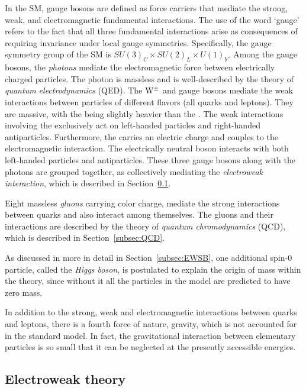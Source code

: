 In the SM, gauge bosons are defined as force carriers that mediate the strong, weak, and electromagnetic fundamental interactions.
The use of the word `gauge' refers to the fact that all three fundamental interactions arise as consequences of requiring invariance under local gauge symmetries. 
Specifically, the gauge symmetry group of the SM is $SU(3)_C \times SU(2)_L \times U(1)_Y$.
Among the gauge bosons, the \textit{photons} mediate the electromagnetic force between electrically charged particles.
The photon is massless and is well-described by the theory of \textit{quantum electrodynamics} (QED).
The $\mathrm{W}^{\pm}$ and \PZ gauge bosons mediate the weak interactions between particles of different flavors (all quarks and leptons).
They are massive, with the \PZ being slightly heavier than the \PW.
The weak interactions involving the \PW exclusively act on left-handed particles and right-handed antiparticles.
Furthermore, the \PW carries an electric charge and couples to the electromagnetic interaction.
The electrically neutral \PZ boson interacts with both left-handed particles and antiparticles.
These three gauge bosons along with the photons are grouped together, as collectively mediating the \textit{electroweak interaction}, which is described in Section~\ref{subsec:EWtheory}.

Eight massless \textit{gluons} carrying color charge, mediate the strong interactions between quarks and also interact among themselves.
The gluons and their interactions are described by the theory of \textit{quantum chromodynamics} (QCD), which is described in Section~\ref{subsec:QCD}.

As discussed in more in detail in Section~\ref{subsec:EWSB}, one additional spin-0 particle, called the \textit{Higgs boson}, is postulated to explain the origin of mass within the theory,
since without it all the particles in the model are predicted to have zero mass.

In addition to the strong, weak and electromagnetic interactions between quarks and leptons, there is a fourth force of nature, gravity, which is not accounted for in the standard model.
In fact, the gravitational interaction between elementary particles is so small that it can be neglected at the presently accessible energies.

\subsection{Electroweak theory}\label{subsec:EWtheory}

